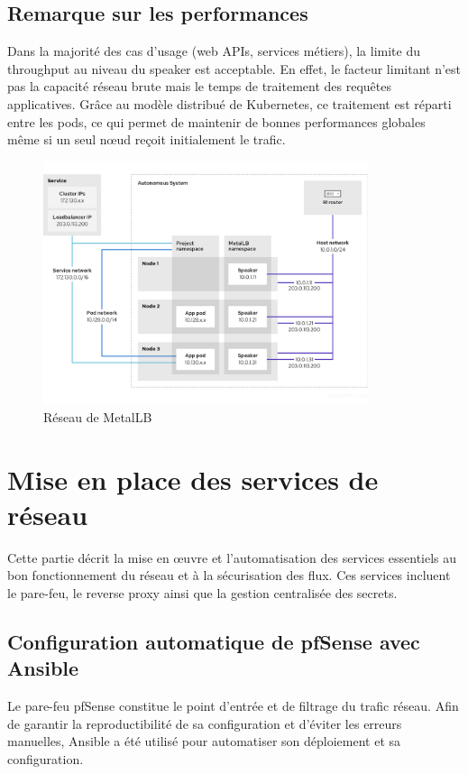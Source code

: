 \subsection{Remarque sur les performances}

Dans la majorité des cas d’usage (web APIs, services métiers), la limite du throughput au niveau du speaker est acceptable. En effet, le facteur limitant n’est pas la capacité réseau brute mais le temps de traitement des requêtes applicatives. Grâce au modèle distribué de Kubernetes, ce traitement est réparti entre les pods, ce qui permet de maintenir de bonnes performances globales même si un seul nœud reçoit initialement le trafic.

\begin{figure}[H]
	\centering
	\includegraphics[width=0.85\textwidth]{figures/Metallb network.png}
	\caption{Réseau de MetalLB}
\end{figure}

\section{Mise en place des services de réseau}

Cette partie décrit la mise en œuvre et l’automatisation des services essentiels au bon fonctionnement du réseau et à la sécurisation des flux. Ces services incluent le pare-feu, le reverse proxy ainsi que la gestion centralisée des secrets.

\subsection{Configuration automatique de pfSense avec Ansible}

Le pare-feu pfSense constitue le point d’entrée et de filtrage du trafic réseau. Afin de garantir la reproductibilité de sa configuration et d’éviter les erreurs manuelles, Ansible a été utilisé pour automatiser son déploiement et sa configuration.

